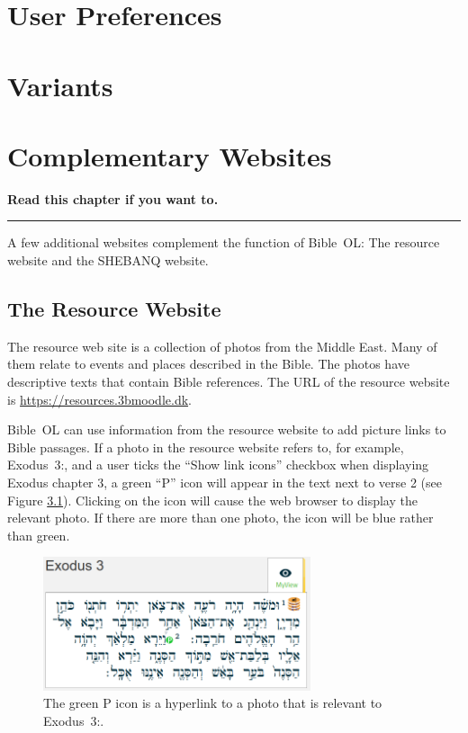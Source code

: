 \documentclass[11pt,oneside,a4paper]{memoir}
\newcommand*{\bibleref}[3]{#1~#2\thinspace:\thinspace#3}
\begin{document}
\chapter{User Preferences} %
\chapter{Variants}





\chapter{Complementary Websites}

\textbf{Read this chapter if you want to.}
\plainbreak{3}


A few additional websites complement the function of Bible~OL: The resource website and the SHEBANQ
website.



\section{The Resource Website}\label{sec-resource-web}

The resource web site is a collection of photos from the Middle East. Many of them relate to events
and places described in the Bible. The photos have descriptive texts that contain Bible references.
The URL of the resource website is \url{https://resources.3bmoodle.dk}.

Bible~OL can use information from the resource website to add picture links to Bible passages. If a
photo in the resource website refers to, for example, \bibleref{Exodus}{3}{2}, and a user ticks the
``Show link icons'' checkbox when displaying Exodus chapter 3, a green ``P'' icon will appear in the
text next to verse 2 (see Figure \ref{fig-exodusiii}). Clicking on the icon will cause the web
browser to display the relevant photo. If there are more than one photo, the icon will be blue
rather than green.


\begin{figure}
  \begin{center}
    \includegraphics[width=0.7\textwidth]{exodus3.png}
  \end{center}
  \caption{The green P icon is a hyperlink to a photo that is relevant to \bibleref{Exodus}{3}{2}.}\label{fig-exodusiii}
\end{figure}
\end{document}
